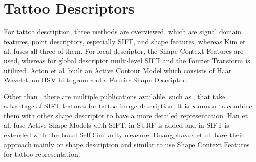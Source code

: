 \documentclass[draft,final]{vutinfth} %
\begin{document}
\section*{Tattoo Descriptors}
\par
For tattoo description, three methods are overviewed, which are signal domain features, point descriptors, especially SIFT, and shape features, whereas Kim et al. \cite{kim2015robust} fuses all three of them. 
For local descriptor, the Shape Context Features are used, whereas for global descriptor multi-level SIFT and the Fourier Transform is utilized. 
Acton et al. \cite{acton2008matching} built an Active Contour Model which consists of Haar Wavelet, an HSV histogram and a Fourier Shape Descriptor.
\par
Other than  \cite{kim2015robust}, there are multiple publications available, such as \cite{duangphasuk2013tattoo}, that take advantage of SIFT features for tattoo image description.
It is common to combine them with other shape descriptor to have a more detailed representation.
Han et al. \cite{han2013tattoo} fuse Active Shape Models with SIFT, in \cite{yi2015impact} SURF is added and in \cite{kim2016tattoo} SIFT is extended with the Local Self Similarity measure.
Duangphasuk et al. \cite{duangphasuk2013tattoo} base their approach mainly on shape description and similar to  \cite{kim2015robust} use Shape Context Features for tattoo representation.
\end{document}
